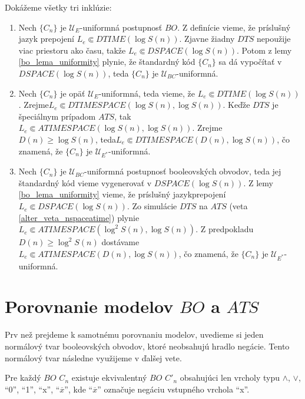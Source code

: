 {\begin{dokaz}
  Dokážeme všetky tri inklúzie:
  \begin{enumerate}
    \item Nech $\{ C_n\}$ je $\mathcal{U}_E$-uniformná postupnosť
    $BO$. Z definície vieme, že príslušný jazyk prepojení $L_e\Subset
    DTIME(\log S(n))$. Zjavne žiadny $DTS$ nepoužije viac priestoru
    ako času, takže $L_e\Subset DSPACE(\log S(n))$. Potom z lemy
    \ref{bo_lema_uniformity} plynie, že štandardný kód $\{ C_n\}$ sa dá
    vypočítať v $DSPACE(\log S(n))$, teda $\{ C_n\}$ je
    $\mathcal{U}_{BC}$-uniformná.
    \item Nech $\{ C_n\}$ je opäť $\mathcal{U}_E$-uniformná, teda
    vieme, že $L_e\Subset DTIME(\log S(n))$. Zrejme\linebreak $L_e\Subset
    DTIMESPACE(\log S(n),\log S(n))$. Keďže $DTS$ je špeciálnym
    prípadom $ATS$, tak $L_e\Subset ATIMESPACE(\log S(n),\log
    S(n))$. Zrejme $D(n)\geq\log S(n)$, teda\newline $L_e\Subset
    DTIMESPACE(D(n),\log S(n))$, čo znamená, že $\{ C_n\}$ je
    $\mathcal{U}_{E^*}$-uniformná.
    \item Nech $\{ C_n\}$ je $\mathcal{U}_{BC}$-uniformná postupnosť booleovských obvodov,
    teda jej štandardný kód vieme vygenerovať v $DSPACE(\log S(n))$. Z
    lemy \ref{bo_lema_uniformity} vieme, že príslušný jazyk\linebreak prepojení $L_e\Subset
    DSPACE(\log S(n))$. Zo simulácie $DTS$ na $ATS$ (veta
    \ref{alter_veta_nspaceatime}) plynie\linebreak $L_e\Subset ATIMESPACE(\log^2 S(n),\log
    S(n))$. Z predpokladu $D(n)\geq\log^2 S(n)$ dostávame $L_e\Subset
    ATIMESPACE(D(n),\log S(n))$, čo znamená, že $\{ C_n\}$ je
    $\mathcal{U}_{E^*}$-uniformná.
  \end{enumerate}
\end{dokaz}

\section{Porovnanie modelov $BO$ a $ATS$}

Prv než prejdeme k samotnému porovnaniu modelov, uvedieme si jeden
normálový tvar booleov\-ských obvodov, ktoré neobsahujú hradlo
negácie. Tento normálový tvar následne využijeme v ďalšej vete.

\begin{lema}
  Pre každý $BO$ $C_n$ existuje ekvivalentný $BO$ $C'_n$ obsahujúci
  len vrcholy typu $\wedge$, $\vee$, ``0'', ``1'', ``x'',
  ``$\overline{x}$'', kde ``$\overline{x}$'' označuje negáciu
  vstupného vrchola ``x''.
\end{lema}

}
